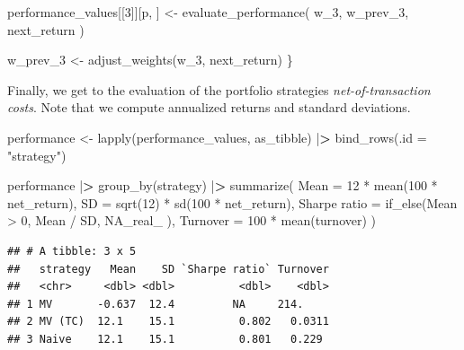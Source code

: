 \documentclass[
]{book}
\newenvironment{Shaded}{\begin{snugshade}}{\end{snugshade}}
\newcommand{\AttributeTok}[1]{\textcolor[rgb]{0.61,0.61,0.61}{#1}}
\newcommand{\ConstantTok}[1]{\textcolor[rgb]{0,0,0}{#1}}
\newcommand{\DecValTok}[1]{\textcolor[rgb]{0.06,0.06,0.06}{#1}}
\newcommand{\ErrorTok}[1]{\textcolor[rgb]{0.14,0.14,0.14}{\textbf{#1}}}
\newcommand{\FunctionTok}[1]{\textcolor[rgb]{0,0,0}{#1}}
\newcommand{\NormalTok}[1]{#1}
\newcommand{\OtherTok}[1]{\textcolor[rgb]{0.37,0.37,0.37}{#1}}
\newcommand{\SpecialCharTok}[1]{\textcolor[rgb]{0,0,0}{#1}}
\newcommand{\StringTok}[1]{\textcolor[rgb]{0.5,0.5,0.5}{#1}}
\begin{document}
\begin{Shaded}
\begin{Highlighting}[]
\NormalTok{  performance\_values[[}\DecValTok{3}\NormalTok{]][p, ] }\OtherTok{\textless{}{-}} \FunctionTok{evaluate\_performance}\NormalTok{(}
\NormalTok{    w\_3,}
\NormalTok{    w\_prev\_3,}
\NormalTok{    next\_return}
\NormalTok{  )}

\NormalTok{  w\_prev\_3 }\OtherTok{\textless{}{-}} \FunctionTok{adjust\_weights}\NormalTok{(w\_3, next\_return)}
\NormalTok{\}}
\end{Highlighting}
\end{Shaded}

Finally, we get to the evaluation of the portfolio strategies \emph{net-of-transaction costs}. Note that we compute annualized returns and standard deviations.

\begin{Shaded}
\begin{Highlighting}[]
\NormalTok{performance }\OtherTok{\textless{}{-}} \FunctionTok{lapply}\NormalTok{(performance\_values, as\_tibble) }\SpecialCharTok{|}\ErrorTok{\textgreater{}}
  \FunctionTok{bind\_rows}\NormalTok{(}\AttributeTok{.id =} \StringTok{"strategy"}\NormalTok{)}

\NormalTok{performance }\SpecialCharTok{|}\ErrorTok{\textgreater{}}
  \FunctionTok{group\_by}\NormalTok{(strategy) }\SpecialCharTok{|}\ErrorTok{\textgreater{}}
  \FunctionTok{summarize}\NormalTok{(}
    \AttributeTok{Mean =} \DecValTok{12} \SpecialCharTok{*} \FunctionTok{mean}\NormalTok{(}\DecValTok{100} \SpecialCharTok{*}\NormalTok{ net\_return),}
    \AttributeTok{SD =} \FunctionTok{sqrt}\NormalTok{(}\DecValTok{12}\NormalTok{) }\SpecialCharTok{*} \FunctionTok{sd}\NormalTok{(}\DecValTok{100} \SpecialCharTok{*}\NormalTok{ net\_return),}
    \StringTok{\textasciigrave{}}\AttributeTok{Sharpe ratio}\StringTok{\textasciigrave{}} \OtherTok{=} \FunctionTok{if\_else}\NormalTok{(Mean }\SpecialCharTok{\textgreater{}} \DecValTok{0}\NormalTok{,}
\NormalTok{      Mean }\SpecialCharTok{/}\NormalTok{ SD,}
      \ConstantTok{NA\_real\_}
\NormalTok{    ),}
    \AttributeTok{Turnover =} \DecValTok{100} \SpecialCharTok{*} \FunctionTok{mean}\NormalTok{(turnover)}
\NormalTok{  )}
\end{Highlighting}
\end{Shaded}

\begin{verbatim}
## # A tibble: 3 x 5
##   strategy   Mean    SD `Sharpe ratio` Turnover
##   <chr>     <dbl> <dbl>          <dbl>    <dbl>
## 1 MV       -0.637  12.4         NA     214.    
## 2 MV (TC)  12.1    15.1          0.802   0.0311
## 3 Naive    12.1    15.1          0.801   0.229
\end{verbatim}
\end{document}
